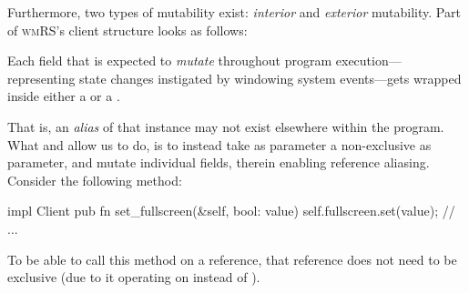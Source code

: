 Furthermore, two types of mutability exist: \textit{interior}
and \textit{exterior} mutability. Part of \textsc{wmRS}'s client structure looks
as follows:

Each field that is expected to \textit{mutate} throughout program
execution---representing state changes instigated by windowing system
events---gets wrapped inside either a  or a .

That is,
an \textit{alias} of that instance may not exist elsewhere within the
program.  What  and  allow
us to do, is to instead take as parameter a non-exclusive  as
parameter, and mutate individual fields, therein enabling reference aliasing.
Consider the following  method:

\begin{rustblock}
  impl Client {
    pub fn set_fullscreen(&self, bool: value) {
      self.fullscreen.set(value);
    }
    // ...
  }
\end{rustblock}

To be able to call this method on a  reference, that reference
does not need to be exclusive (due to it operating on  instead of
).

